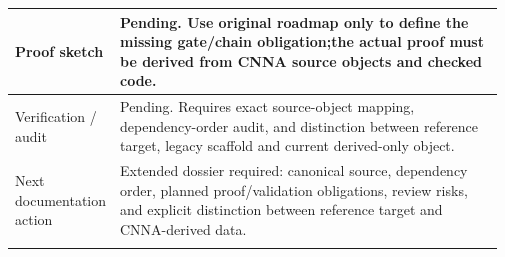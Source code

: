 \begin{longtable}{L{0.16\linewidth} L{0.81\linewidth}}
Proof sketch & Pending. Use original roadmap only to define the missing gate/\allowbreak{}chain obligation;\newline the actual proof must be derived from CNNA source objects and checked code.\\
\hline\addlinespace[0.20em]
Verification /\allowbreak{} audit & Pending. Requires exact source-object mapping, dependency-order audit, and distinction between reference target, legacy scaffold and current derived-only object.\\
\hline\addlinespace[0.20em]
Next documentation action & Extended dossier required: canonical source, dependency order, planned proof/\allowbreak{}validation obligations, review risks, and explicit distinction between reference target and CNNA-derived data.\\
\hline\addlinespace[0.20em]
\end{longtable}
